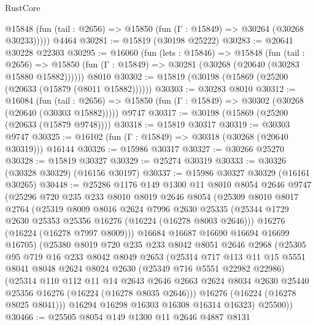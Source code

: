 \begin{lexlean}{RustCore}
\begin{coremodule}
      @15848 (fun (tail : @2656) => @15850 (fun (Γ : @15849) => @30264 (@30268 @30233)))))
    @4464
@30281 := @15819 (@30198 @25222)
@30283 := @20641 @30228 @22303
@30295 := @16060
    (fun (lets : @15846) =>
    @15848
      (fun (tail : @2656) =>
      @15850 (fun (Γ : @15849) => @30281 (@30268 (@20640 (@30283 @15880 @15882))))))
    @8010
@30302 := @15819 (@30198 (@15869 (@25200 (@20633 (@15879 (@8011 @15882))))))
@30303 := @30283 @8010
@30312 := @16084
    (fun (tail : @2656) => @15850 (fun (Γ : @15849) => @30302 (@30268 (@20640 (@30303 @15882)))))
    @9747
@30317 := @30198 (@15869 (@25200 (@20633 (@15879 @9748))))
@30318 := @15819 @30317
@30319 := @30303 @9747
@30325 := @16102 (fun (Γ : @15849) => @30318 (@30268 (@20640 @30319))) @16144
@30326 := @15986 @30317
@30327 := @30266 @25270
@30328 := @15819 @30327
@30329 := @25274 @30319
@30333 := @30326 (@30328 @30329) (@16156 @30197)
@30337 := @15986 @30327 @30329 (@16161 @30265)
@30448 := @25286
    @1176
    @149
    @1300
    @11
    @8010
    @8054
    @2646
    @9747
    (@25296
      @720
      @235
      @233
      @8010
      @8019
      @2646
      @8054
      (@25309
        @8010
        @8017
        @2764
        (@25319
          @8009
          @8016
          @2624
          @7996
          @2630
          @25335
          (@25344 @1729 @2630 @25353 @25356 @16276 (@16224 (@16278 @8003 @2646)))
          @16276
          (@16224 (@16278 @7997 @8009)))
        @16684
        @16687
        @16690
        @16694
        @16699
        @16705)
      (@25380
        @8019
        @720
        @235
        @233
        @8042
        @8051
        @2646
        @2968
        (@25305
          @95
          @719
          @16
          @233
          @8042
          @8049
          @2653
          (@25314
            @717
            @113
            @11
            @15
            @5551
            @8041
            @8048
            @2624
            @8024
            @2630
            (@25349 @716 @5551 @22982 @22986)
            (@25314
              @110
              @112
              @11
              @14
              @2643
              @2646
              @2663
              @2624
              @8034
              @2630
              @25440
              @25356
              @16276
              (@16224 (@16278 @8035 @2646)))
            @16276
            (@16224 (@16278 @8025 @8041)))
          @16294
          @16298
          @16303
          @16308
          @16314
          @16323)
        @25500))
@30466 := @25505
    @8054
    @149
    @1300
    @11
    @2646
    @4887
    @8131

\end{coremodule}
\end{lexlean}
